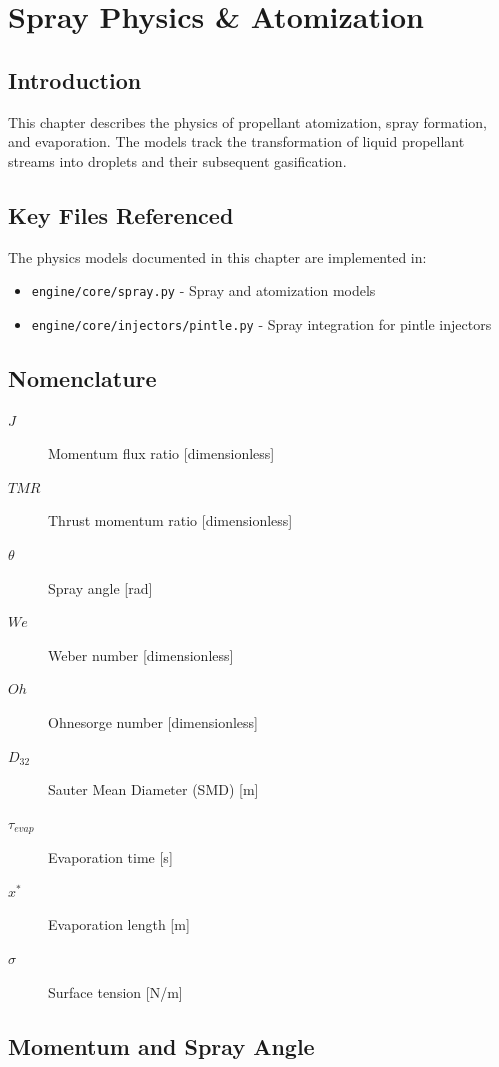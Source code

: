 \section{Spray Physics \& Atomization}

\subsection{Introduction}
This chapter describes the physics of propellant atomization, spray formation, and evaporation. The models track the transformation of liquid propellant streams into droplets and their subsequent gasification.

\subsection{Key Files Referenced}
The physics models documented in this chapter are implemented in:
\begin{itemize}
    \item \texttt{engine/core/spray.py} - Spray and atomization models
    \item \texttt{engine/core/injectors/pintle.py} - Spray integration for pintle injectors
\end{itemize}

\subsection{Nomenclature}
\begin{description}
    \item[$J$] Momentum flux ratio [dimensionless]
    \item[$TMR$] Thrust momentum ratio [dimensionless]
    \item[$\theta$] Spray angle [\si{rad}]
    \item[$We$] Weber number [dimensionless]
    \item[$Oh$] Ohnesorge number [dimensionless]
    \item[$D_{32}$] Sauter Mean Diameter (SMD) [\si{m}]
    \item[$\tau_{evap}$] Evaporation time [\si{s}]
    \item[$x^*$] Evaporation length [\si{m}]
    \item[$\sigma$] Surface tension [\si{N/m}]
\end{description}

\subsection{Momentum and Spray Angle}


